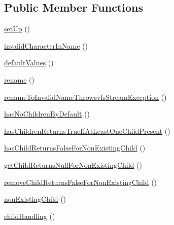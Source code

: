 \subsection*{Public Member Functions}
\begin{DoxyCompactItemize}
\item 
\mbox{\hyperlink{classorg_1_1bovigo_1_1vfs_1_1vfs_stream_directory_test_case_a0bc688732d2b3b162ffebaf7812e78da}{set\+Up}} ()
\item 
\mbox{\hyperlink{classorg_1_1bovigo_1_1vfs_1_1vfs_stream_directory_test_case_af55ab798037d65778803c3eede0f9541}{invalid\+Character\+In\+Name}} ()
\item 
\mbox{\hyperlink{classorg_1_1bovigo_1_1vfs_1_1vfs_stream_directory_test_case_a793367a59a4ecb95c6c35fae5441801b}{default\+Values}} ()
\item 
\mbox{\hyperlink{classorg_1_1bovigo_1_1vfs_1_1vfs_stream_directory_test_case_a5f13470498476878e37541d041e31b80}{rename}} ()
\item 
\mbox{\hyperlink{classorg_1_1bovigo_1_1vfs_1_1vfs_stream_directory_test_case_a7363626c0b0ee97ed57535a59a464183}{rename\+To\+Invalid\+Name\+Throwsvfs\+Stream\+Exception}} ()
\item 
\mbox{\hyperlink{classorg_1_1bovigo_1_1vfs_1_1vfs_stream_directory_test_case_ace21aeb741fde282876a1a5a91eef6e4}{has\+No\+Children\+By\+Default}} ()
\item 
\mbox{\hyperlink{classorg_1_1bovigo_1_1vfs_1_1vfs_stream_directory_test_case_a70ad0a431ec46d2e58a589fb41a441a4}{has\+Children\+Returns\+True\+If\+At\+Least\+One\+Child\+Present}} ()
\item 
\mbox{\hyperlink{classorg_1_1bovigo_1_1vfs_1_1vfs_stream_directory_test_case_a175756c843e09c4c7cd150d9fbd90cf2}{has\+Child\+Returns\+False\+For\+Non\+Existing\+Child}} ()
\item 
\mbox{\hyperlink{classorg_1_1bovigo_1_1vfs_1_1vfs_stream_directory_test_case_af9a921bed83aff9506f39f97e76a5947}{get\+Child\+Returns\+Null\+For\+Non\+Existing\+Child}} ()
\item 
\mbox{\hyperlink{classorg_1_1bovigo_1_1vfs_1_1vfs_stream_directory_test_case_a99581f584962ba1a2939352207e2c1a4}{remove\+Child\+Returns\+False\+For\+Non\+Existing\+Child}} ()
\item 
\mbox{\hyperlink{classorg_1_1bovigo_1_1vfs_1_1vfs_stream_directory_test_case_a44a00a1c25789805ca5a3f66e3f73f13}{non\+Existing\+Child}} ()
\item 
\mbox{\hyperlink{classorg_1_1bovigo_1_1vfs_1_1vfs_stream_directory_test_case_ae0478a10e4f5cfc3d187df9417efbe66}{child\+Handling}} ()

\end{DoxyCompactItemize}
